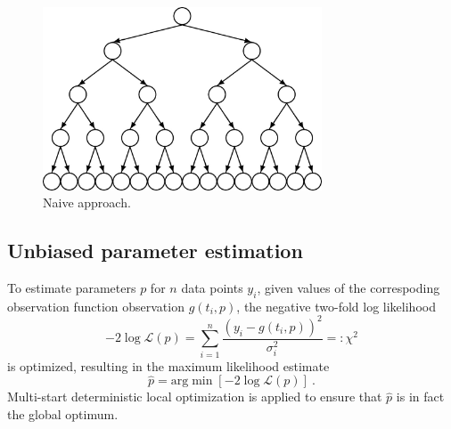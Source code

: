 \documentclass{bioinfo}
\begin{document}
\begin{figure}[!tpb]%
\centerline{\includegraphics[width=235pt]{Figures/tree.jpg}}
\caption{Naive approach.}\label{fig:01}
\end{figure}

\subsection{Unbiased parameter estimation}

To estimate parameters $p$ for $n$ data points ${y_i}$, given values of the correspoding observation function observation $g(t_i,p)$, the negative two-fold log likelihood
\begin{equation}
-2\log \mathcal L(p) = \sum_{i=1}^n \frac{(y_i-g(t_i,p))^2}{\sigma_i^2} =: \chi^2\label{eq:lik}
\end{equation}
is optimized, resulting in the maximum likelihood estimate
\begin{equation}
\hat p = \text{arg}\min \left[ -2\log \mathcal L(p) \right] \:.
\end{equation}
Multi-start deterministic local optimization is applied to ensure that $\hat p$ is in fact the global optimum.
\end{document}

